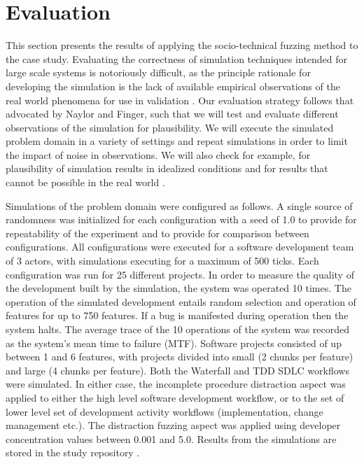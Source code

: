 \documentclass{llncs}
\begin{document}

\section{Evaluation}


This section presents the results of applying the socio-technical fuzzing method to the case study.  Evaluating the
correctness of simulation techniques intended for large scale systems is notoriously difficult, as the principle
rationale for developing the simulation is the lack of available empirical observations of the real world phenomena for
use in validation \citet{naylor67verification}.  Our evaluation strategy follows that advocated by Naylor and Finger,
such that we will test and evaluate different observations of the simulation for plausibility.  We will execute the
simulated problem domain in a variety of settings and repeat simulations in order to limit the impact of noise in
observations.  We will also check for example, for plausibility of simulation results in idealized conditions
\cite{shull11assuring} and for results that cannot be possible in the real world \cite{weyuker82testing}.

Simulations of the problem domain were configured as follows.  A single source of randomness was initialized for each
configuration with a seed of 1.0 to provide for repeatability of the experiment and to provide for comparison between
configurations. All configurations were executed for a software development team of 3 actors, with simulations executing
for a maximum of 500 ticks.  Each configuration was run for 25 different projects.  In order to measure the quality of
the development built by the simulation, the system was operated 10 times.  The operation of the simulated development
entails random selection and operation of features for up to 750 features.  If a bug is manifested during operation then
the system halts.  The average trace of the 10 operations of the system was recorded as the system's mean time to
failure (MTF). Software projects consisted of up between 1 and 6 features, with projects divided into small (2 chunks
per feature) and large (4 chunks per feature). Both the Waterfall and TDD SDLC workflows were simulated.  In either
case, the incomplete procedure distraction aspect was applied to either the high level software development workflow, or
to the set of lower level set of development activity workflows (implementation, change management etc.).  The
distraction fuzzing aspect was applied using developer concentration values between 0.001 and 5.0.  Results from the
simulations are stored in the study repository \citep{storer2016softdev-workflow-scm}.
\end{document}
